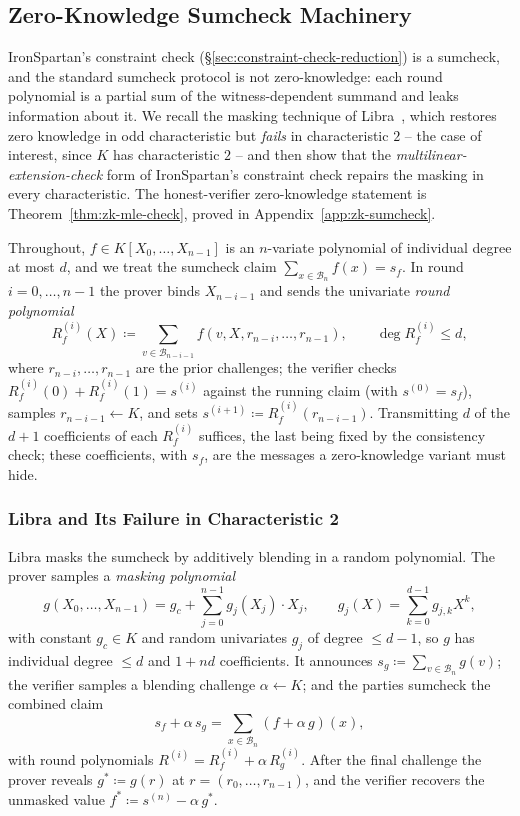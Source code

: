 \documentclass{article}
\theoremstyle{definition}
\newcommand{\BB}{\mathcal{B}}
\begin{document}
\subsection{Zero-Knowledge Sumcheck Machinery}
\label{sec:zk-sumcheck-machinery}

IronSpartan's constraint check (\S\ref{sec:constraint-check-reduction}) is a sumcheck, and the standard sumcheck protocol is not zero-knowledge: each round polynomial is a partial sum of the witness-dependent summand and leaks information about it. We recall the masking technique of Libra~\cite{Xie:2019aa}, which restores zero knowledge in odd characteristic but \emph{fails} in characteristic $2$ -- the case of interest, since $K$ has characteristic $2$ -- and then show that the \emph{multilinear-extension-check} form of IronSpartan's constraint check repairs the masking in every characteristic. The honest-verifier zero-knowledge statement is Theorem~\ref{thm:zk-mle-check}, proved in Appendix~\ref{app:zk-sumcheck}.

Throughout, $f \in K[X_0, \ldots, X_{n - 1}]$ is an $n$-variate polynomial of individual degree at most $d$, and we treat the sumcheck claim $\sum_{x \in \BB_n} f(x) = s_f$. In round $i = 0, \ldots, n - 1$ the prover binds $X_{n - i - 1}$ and sends the univariate \emph{round polynomial}
\[
  R_f^{(i)}(X) \coloneqq \sum_{v \in \BB_{n - i - 1}} f(v, X, r_{n - i}, \ldots, r_{n - 1}), \qquad \deg R_f^{(i)} \le d,
\]
where $r_{n - i}, \ldots, r_{n - 1}$ are the prior challenges; the verifier checks $R_f^{(i)}(0) + R_f^{(i)}(1) = s^{(i)}$ against the running claim (with $s^{(0)} = s_f$), samples $r_{n - i - 1} \gets K$, and sets $s^{(i + 1)} \coloneqq R_f^{(i)}(r_{n - i - 1})$. Transmitting $d$ of the $d + 1$ coefficients of each $R_f^{(i)}$ suffices, the last being fixed by the consistency check; these coefficients, with $s_f$, are the messages a zero-knowledge variant must hide.

\subsubsection{Libra and Its Failure in Characteristic 2}
\label{sec:libra}

Libra masks the sumcheck by additively blending in a random polynomial. The prover samples a \emph{masking polynomial}
\[
  g(X_0, \ldots, X_{n - 1}) = g_c + \sum_{j = 0}^{n - 1} g_j(X_j) \cdot X_j, \qquad g_j(X) = \sum_{k = 0}^{d - 1} g_{j, k} X^k,
\]
with constant $g_c \in K$ and random univariates $g_j$ of degree $\le d - 1$, so $g$ has individual degree $\le d$ and $1 + nd$ coefficients. It announces $s_g \coloneqq \sum_{v \in \BB_n} g(v)$; the verifier samples a blending challenge $\alpha \gets K$; and the parties sumcheck the combined claim
\[
  s_f + \alpha\, s_g = \sum_{x \in \BB_n} (f + \alpha\, g)(x),
\]
with round polynomials $R^{(i)} = R_f^{(i)} + \alpha\, R_g^{(i)}$. After the final challenge the prover reveals $g^* \coloneqq g(r)$ at $r = (r_0, \ldots, r_{n - 1})$, and the verifier recovers the unmasked value $f^* \coloneqq s^{(n)} - \alpha\, g^*$.
\end{document}
